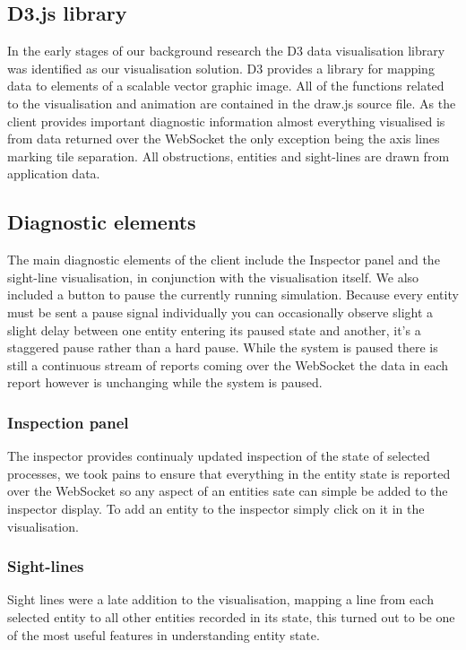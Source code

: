 \subsection{D3.js library}
In the early stages of our background research the D3 data visualisation library was identified as our visualisation solution. D3 provides a library for mapping data to elements of a scalable vector graphic image. All of the functions related to the visualisation and animation are contained in the draw.js source file. As the client provides important diagnostic information almost everything visualised is from data returned over the WebSocket the only exception being the axis lines marking tile separation. All obstructions, entities and sight-lines are drawn from application data.
\subsection{Diagnostic elements}
The main diagnostic elements of the client include the Inspector panel and the sight-line visualisation, in conjunction with the visualisation itself. We also included a button to pause the currently running simulation. Because every entity must be sent a pause signal individually you can occasionally observe slight a slight delay between one entity entering its paused state and another, it's a staggered pause rather than a hard pause. While the system is paused there is still a continuous stream of reports coming over the WebSocket the data in each report however is unchanging while the system is paused.
\subsubsection{Inspection panel}
The inspector provides continualy updated inspection of the state of selected processes, we took pains to ensure that everything in the entity state is reported over the WebSocket so any aspect of an entities sate can simple be added to the inspector display. To add an entity to the inspector simply click on it in the visualisation.
\subsubsection{Sight-lines}
Sight lines were a late addition to the visualisation, mapping a line from each selected entity to all other entities recorded in its state, this turned out to be one of the most useful features in understanding entity state.

\clearpage
\endinput
